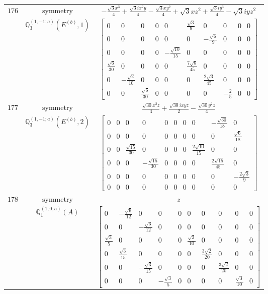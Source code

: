 \documentclass[fleqn,8pt,landscape]{jsarticle}
\begin{document}
\begin{longtable}{ccc}
$ 176 $ & $ \text{symmetry} $ & $ - \frac{\sqrt{3} x^{3}}{4} + \frac{\sqrt{3} i x^{2} y}{4} - \frac{\sqrt{3} x y^{2}}{4} + \sqrt{3} x z^{2} + \frac{\sqrt{3} i y^{3}}{4} - \sqrt{3} i y z^{2} $ \\
$  $ & $ \mathbb{Q}_{3}^{(1,-1;a)}(E^{(b)},1) $ & $ \begin{bmatrix} 0 & 0 & 0 & 0 & 0 & \frac{\sqrt{3}}{9} & 0 & 0 & 0 & 0 \\ 0 & 0 & 0 & 0 & 0 & 0 & - \frac{\sqrt{6}}{9} & 0 & 0 & 0 \\ 0 & 0 & 0 & 0 & - \frac{\sqrt{10}}{15} & 0 & 0 & 0 & 0 & 0 \\ \frac{\sqrt{6}}{30} & 0 & 0 & 0 & 0 & \frac{7 \sqrt{6}}{45} & 0 & 0 & 0 & 0 \\ 0 & - \frac{\sqrt{2}}{10} & 0 & 0 & 0 & 0 & \frac{2 \sqrt{3}}{45} & 0 & 0 & 0 \\ 0 & 0 & \frac{\sqrt{6}}{30} & 0 & 0 & 0 & 0 & - \frac{2}{5} & 0 & 0 \end{bmatrix} $ \\ \hline
$ 177 $ & $ \text{symmetry} $ & $ \frac{\sqrt{30} x^{2} z}{4} + \frac{\sqrt{30} i x y z}{2} - \frac{\sqrt{30} y^{2} z}{4} $ \\
$  $ & $ \mathbb{Q}_{3}^{(1,-1;a)}(E^{(b)},2) $ & $ \begin{bmatrix} 0 & 0 & 0 & 0 & 0 & 0 & 0 & 0 & - \frac{\sqrt{30}}{18} & 0 \\ 0 & 0 & 0 & 0 & 0 & 0 & 0 & 0 & 0 & \frac{\sqrt{6}}{18} \\ 0 & 0 & \frac{\sqrt{15}}{30} & 0 & 0 & 0 & 0 & \frac{2 \sqrt{10}}{15} & 0 & 0 \\ 0 & 0 & 0 & - \frac{\sqrt{15}}{30} & 0 & 0 & 0 & 0 & \frac{2 \sqrt{15}}{45} & 0 \\ 0 & 0 & 0 & 0 & 0 & 0 & 0 & 0 & 0 & - \frac{2 \sqrt{3}}{9} \\ 0 & 0 & 0 & 0 & 0 & 0 & 0 & 0 & 0 & 0 \end{bmatrix} $ \\ \hline
$ 178 $ & $ \text{symmetry} $ & $ z $ \\
$  $ & $ \mathbb{Q}_{1}^{(1,0;a)}(A) $ & $ \begin{bmatrix} 0 & - \frac{\sqrt{6}}{12} & 0 & 0 & 0 & 0 & 0 & 0 & 0 & 0 \\ 0 & 0 & - \frac{\sqrt{6}}{12} & 0 & 0 & 0 & 0 & 0 & 0 & 0 \\ \frac{\sqrt{3}}{5} & 0 & 0 & 0 & 0 & \frac{\sqrt{3}}{10} & 0 & 0 & 0 & 0 \\ 0 & \frac{\sqrt{3}}{15} & 0 & 0 & 0 & 0 & \frac{3 \sqrt{2}}{20} & 0 & 0 & 0 \\ 0 & 0 & - \frac{\sqrt{3}}{15} & 0 & 0 & 0 & 0 & \frac{3 \sqrt{2}}{20} & 0 & 0 \\ 0 & 0 & 0 & - \frac{\sqrt{3}}{5} & 0 & 0 & 0 & 0 & \frac{\sqrt{3}}{10} & 0 \end{bmatrix} $ \\ \hline

\end{longtable}
\end{document}
